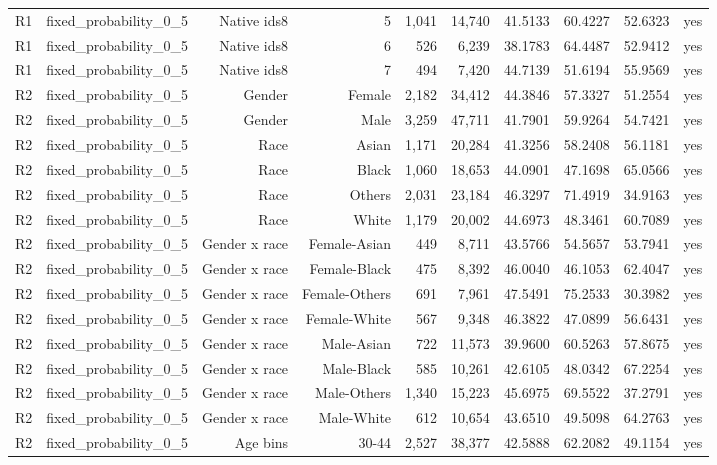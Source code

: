 \documentclass[10pt]{article}
\begin{document}
\begin{longtable}{@{}lrrrrrrrrr@{}}
R1 & fixed\_probability\_0\_5 & Native ids8 & 5 & 1,041 & 14,740 & 41.5133 & 60.4227 & 52.6323 & yes \\
R1 & fixed\_probability\_0\_5 & Native ids8 & 6 & 526 & 6,239 & 38.1783 & 64.4487 & 52.9412 & yes \\
R1 & fixed\_probability\_0\_5 & Native ids8 & 7 & 494 & 7,420 & 44.7139 & 51.6194 & 55.9569 & yes \\
R2 & fixed\_probability\_0\_5 & Gender & Female & 2,182 & 34,412 & 44.3846 & 57.3327 & 51.2554 & yes \\
R2 & fixed\_probability\_0\_5 & Gender & Male & 3,259 & 47,711 & 41.7901 & 59.9264 & 54.7421 & yes \\
R2 & fixed\_probability\_0\_5 & Race & Asian & 1,171 & 20,284 & 41.3256 & 58.2408 & 56.1181 & yes \\
R2 & fixed\_probability\_0\_5 & Race & Black & 1,060 & 18,653 & 44.0901 & 47.1698 & 65.0566 & yes \\
R2 & fixed\_probability\_0\_5 & Race & Others & 2,031 & 23,184 & 46.3297 & 71.4919 & 34.9163 & yes \\
R2 & fixed\_probability\_0\_5 & Race & White & 1,179 & 20,002 & 44.6973 & 48.3461 & 60.7089 & yes \\
R2 & fixed\_probability\_0\_5 & Gender x race & Female-Asian & 449 & 8,711 & 43.5766 & 54.5657 & 53.7941 & yes \\
R2 & fixed\_probability\_0\_5 & Gender x race & Female-Black & 475 & 8,392 & 46.0040 & 46.1053 & 62.4047 & yes \\
R2 & fixed\_probability\_0\_5 & Gender x race & Female-Others & 691 & 7,961 & 47.5491 & 75.2533 & 30.3982 & yes \\
R2 & fixed\_probability\_0\_5 & Gender x race & Female-White & 567 & 9,348 & 46.3822 & 47.0899 & 56.6431 & yes \\
R2 & fixed\_probability\_0\_5 & Gender x race & Male-Asian & 722 & 11,573 & 39.9600 & 60.5263 & 57.8675 & yes \\
R2 & fixed\_probability\_0\_5 & Gender x race & Male-Black & 585 & 10,261 & 42.6105 & 48.0342 & 67.2254 & yes \\
R2 & fixed\_probability\_0\_5 & Gender x race & Male-Others & 1,340 & 15,223 & 45.6975 & 69.5522 & 37.2791 & yes \\
R2 & fixed\_probability\_0\_5 & Gender x race & Male-White & 612 & 10,654 & 43.6510 & 49.5098 & 64.2763 & yes \\
R2 & fixed\_probability\_0\_5 & Age bins & 30-44 & 2,527 & 38,377 & 42.5888 & 62.2082 & 49.1154 & yes \\

\end{longtable}
\end{document}
